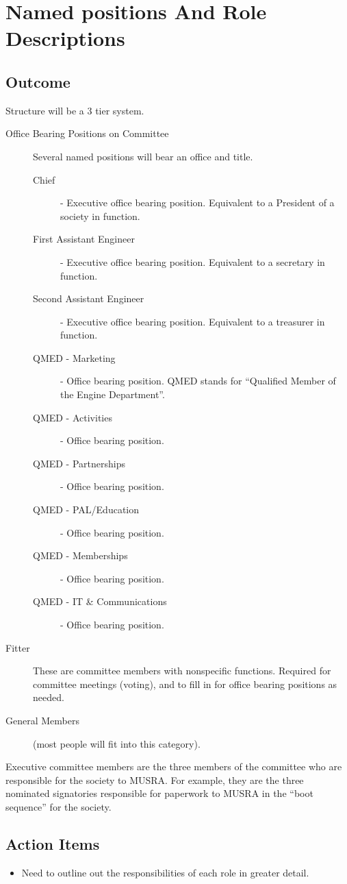 \section{Named positions And Role Descriptions}
\label{sec:NamedPositions}
\subsection{Outcome}
Structure will be a 3 tier system.
\begin{description}
  \item[Office Bearing Positions on Committee] Several named positions will bear
  an office and title.
  \begin{description}
    \item[Chief] - Executive office bearing position. Equivalent to a President
    of a society in function.
    \item[First Assistant Engineer] - Executive office bearing position.
    Equivalent to a secretary in function.
    \item[Second Assistant Engineer] - Executive office bearing position.
    Equivalent to a treasurer in function.
    \item[QMED - Marketing] - Office bearing position. QMED stands for
    ``Qualified Member of the Engine Department''.
    \item[QMED - Activities] - Office bearing position.
    \item[QMED - Partnerships] - Office bearing position.
    \item[QMED - PAL/Education] - Office bearing position.
    \item[QMED - Memberships] - Office bearing position.
    \item[QMED - IT \& Communications] - Office bearing position.
  \end{description}
  \item[Fitter] These are committee members with nonspecific functions. Required
  for committee meetings (voting), and to fill in for office bearing positions
  as needed.
  \item[General Members] (most people will fit into this category).
\end{description}

Executive committee members are the three members of the committee who are
responsible for the society to MUSRA. For example, they are the three nominated
signatories responsible for paperwork to MUSRA in the ``boot sequence'' for the society.

\subsection{Action Items}
\begin{itemize}
  \item Need to outline out the responsibilities of each role in greater detail.
\end{itemize}
